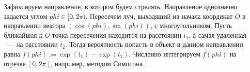 Зафиксируем направление, в котором будем стрелять. Направление
однозначно задается углом $phi \in [0, 2\pi)$. Пересечем луч, выходящий
из начала координат $O$ в направлении вектора $(\cos(phi), \sin(phi))$,
с многоугольником. Пусть ближайшая к $O$ точка пересечения находится
на расстоянии $t_1$, а самая удаленная ~--- на расстоянии $t_2$.
Тогда вероятность попасть в объект в данном направлении равна
$f(phi) := \exp(t_1) - \exp(t_2)$. Численно интегрируем $f(phi)$ на
отрезке $[0, 2\pi]$, например, методом Симпсона.

